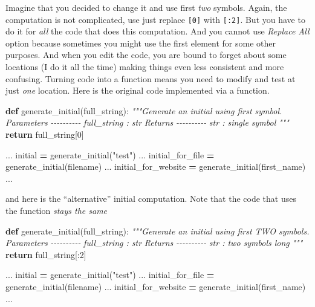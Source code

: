 \documentclass[
]{book}
\newenvironment{Shaded}{\begin{snugshade}}{\end{snugshade}}
\newcommand{\CommentTok}[1]{\textcolor[rgb]{0.56,0.35,0.01}{\textit{#1}}}
\newcommand{\ControlFlowTok}[1]{\textcolor[rgb]{0.13,0.29,0.53}{\textbf{#1}}}
\newcommand{\DecValTok}[1]{\textcolor[rgb]{0.00,0.00,0.81}{#1}}
\newcommand{\KeywordTok}[1]{\textcolor[rgb]{0.13,0.29,0.53}{\textbf{#1}}}
\newcommand{\NormalTok}[1]{#1}
\newcommand{\OperatorTok}[1]{\textcolor[rgb]{0.81,0.36,0.00}{\textbf{#1}}}
\newcommand{\StringTok}[1]{\textcolor[rgb]{0.31,0.60,0.02}{#1}}
\begin{document}
Imagine that you decided to change it and use first \emph{two} symbols. Again, the computation is not complicated, use just replace \texttt{{[}0{]}} with \texttt{{[}:2{]}}. But you have to do it for \emph{all} the code that does this computation. And you cannot use \emph{Replace All} option because sometimes you might use the first element for some other purposes. And when you edit the code, you are bound to forget about some locations (I do it all the time) making things even less consistent and more confusing. Turning code into a function means you need to modify and test at just \emph{one} location. Here is the original code implemented via a function.

\begin{Shaded}
\begin{Highlighting}[]
\KeywordTok{def}\NormalTok{ generate\_initial(full\_string):}
    \CommentTok{"""Generate an initial using first symbol.}
\CommentTok{    }
\CommentTok{    Parameters}
\CommentTok{    {-}{-}{-}{-}{-}{-}{-}{-}{-}{-}}
\CommentTok{    full\_string : str}
\CommentTok{    }
\CommentTok{    Returns}
\CommentTok{    {-}{-}{-}{-}{-}{-}{-}{-}{-}{-}}
\CommentTok{    str : single symbol}
\CommentTok{    """}
    \ControlFlowTok{return}\NormalTok{ full\_string[}\DecValTok{0}\NormalTok{]}

\NormalTok{...}
\NormalTok{initial }\OperatorTok{=}\NormalTok{ generate\_initial(}\StringTok{"test"}\NormalTok{)}
\NormalTok{...}
\NormalTok{initial\_for\_file }\OperatorTok{=}\NormalTok{ generate\_initial(filename)}
\NormalTok{...}
\NormalTok{initial\_for\_website }\OperatorTok{=}\NormalTok{ generate\_initial(first\_name)}
\NormalTok{...}
\end{Highlighting}
\end{Shaded}

and here is the ``alternative'' initial computation. Note that the code that uses the function \emph{stays the same}

\begin{Shaded}
\begin{Highlighting}[]
\KeywordTok{def}\NormalTok{ generate\_initial(full\_string):}
    \CommentTok{"""Generate an initial using first TWO symbols.}
\CommentTok{    }
\CommentTok{    Parameters}
\CommentTok{    {-}{-}{-}{-}{-}{-}{-}{-}{-}{-}}
\CommentTok{    full\_string : str}
\CommentTok{    }
\CommentTok{    Returns}
\CommentTok{    {-}{-}{-}{-}{-}{-}{-}{-}{-}{-}}
\CommentTok{    str : two symbols long}
\CommentTok{    """}
    \ControlFlowTok{return}\NormalTok{ full\_string[:}\DecValTok{2}\NormalTok{]}

\NormalTok{...}
\NormalTok{initial }\OperatorTok{=}\NormalTok{ generate\_initial(}\StringTok{"test"}\NormalTok{)}
\NormalTok{...}
\NormalTok{initial\_for\_file }\OperatorTok{=}\NormalTok{ generate\_initial(filename)}
\NormalTok{...}
\NormalTok{initial\_for\_website }\OperatorTok{=}\NormalTok{ generate\_initial(first\_name)}
\NormalTok{...}
\end{Highlighting}
\end{Shaded}
\end{document}
